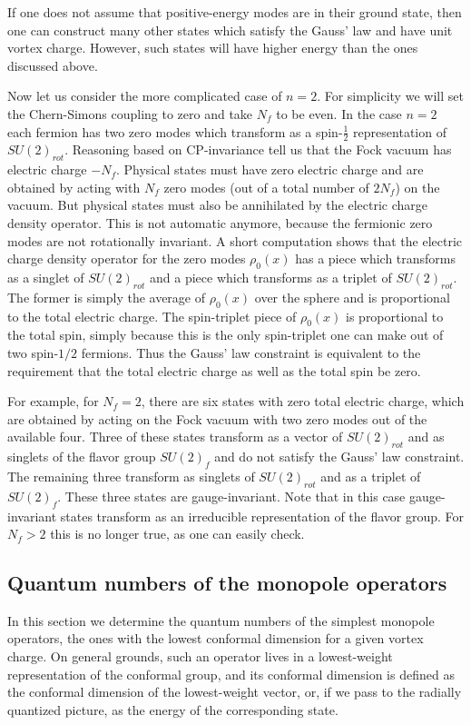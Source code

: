 \documentclass[a4paper,12pt, amsfonts, amssymb]{article}
\begin{document}
If one does not assume that positive-energy modes are in their
ground state, then one can construct many other states which
satisfy the Gauss' law and have unit vortex charge. However,
such states will have higher energy than the ones discussed
above. 

Now let us consider the more complicated case of $n=2$. For 
simplicity we will set the Chern-Simons coupling to zero and take $N_f$ to
be even.
In the case $n=2$ each fermion has two zero modes which transform as 
a spin-$\frac{1}{2}$ representation of $SU(2)_{rot}$. 
Reasoning based on CP-invariance
tell us that the Fock vacuum has
electric charge $-N_f$. Physical states must
have zero electric charge and are obtained by acting with $N_f$
zero modes (out of a total number of $2N_f$) on the vacuum.
But physical states must also be annihilated by the electric charge density
operator. This is not automatic anymore, because the fermionic zero modes 
are not rotationally invariant. A short computation shows that the
electric charge density operator for the zero modes $\rho_0(x)$ has a piece which transforms as a singlet of $SU(2)_{rot}$ and a piece which transforms 
as a triplet of $SU(2)_{rot}$. The former is simply the average of 
$\rho_0(x)$ over the sphere and is proportional to the total electric charge.
The spin-triplet piece of $\rho_0(x)$ is proportional to the total spin, simply because this is the only spin-triplet one can make out of two 
spin-$1/2$ fermions. Thus the Gauss' law constraint is equivalent to the requirement that the total electric charge as well as the total spin be zero.

For example, for
$N_f=2$, there are six states with zero total electric charge, which
are obtained by acting on the Fock vacuum with two zero modes out of the
available four. Three of these states transform as a vector of $SU(2)_{rot}$
and as singlets of the flavor group $SU(2)_f$ and do not
satisfy the Gauss' law constraint. The remaining three transform
as singlets of $SU(2)_{rot}$ and as a triplet of $SU(2)_f$.
These three states are gauge-invariant. Note that in this case gauge-invariant states transform as an irreducible representation of the flavor group.
For $N_f>2$ this is no longer true, as one can easily check.

\subsection{Quantum numbers of the monopole operators}

In this section we determine the quantum numbers of the simplest
monopole operators, the ones with the lowest conformal dimension for a
given vortex charge.
On general grounds, such an operator lives in a lowest-weight representation
of the conformal group, and its conformal dimension is defined as the
conformal dimension of the lowest-weight vector, or, if we pass to the
radially quantized picture, as the energy of the corresponding state.
\end{document}
